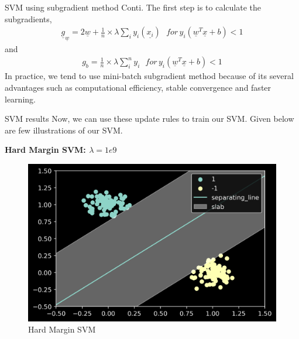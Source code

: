 \documentclass{beamer}
\newcommand\fourspace{\,\,\,\,}
\renewcommand{\vec}[1]{\underline{#1}}
\begin{document}
\begin{frame}{SVM using subgradient method Conti.}
    The first step is to calculate the subgradients, 
\begin{align}
    \vec{g}_{\vec{w}} = 2\vec{w}+\frac{1}{n}\times\lambda\displaystyle\sum_i y_i\left(\vec{x_i}\right) \fourspace for\,  y_i\left(\vec{w}^T\vec{x}+b\right) < 1
\end{align}
and
\begin{align}
    g_{b} = \frac{1}{n}\times\lambda\displaystyle\sum_i^{n} y_i \fourspace for\,  y_i\left(\vec{w}^T\vec{x}+b\right) < 1
\end{align}
\cite{boyd2008stochastic}In practice, we tend to use mini-batch subgradient method because of its several advantages such as computational efficiency, stable convergence and faster learning.
\end{frame}

\begin{frame}{SVM results}
    Now, we can use these update rules to train our SVM. Given below are few illustrations of our SVM.

    \textbf{Hard Margin SVM: $\lambda = 1e9$}
    \begin{figure}[H]
        \centering
        \includegraphics[scale=0.5]{../../results/svm(train_data).png}
        \caption{Hard Margin SVM}
        \label{hardmargin}
    \end{figure}
\end{frame}
\end{document}
